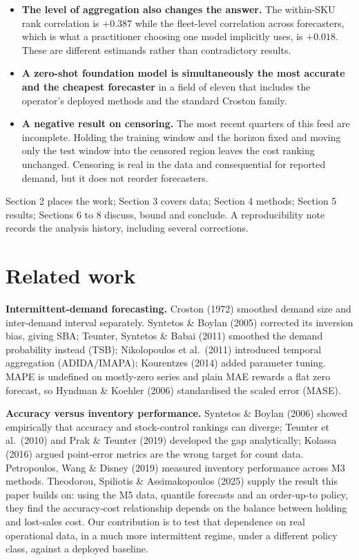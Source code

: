\documentclass[11pt]{article}
\begin{document}
\begin{itemize}
  series at $+1$, because the analytic condition holds for only 10.1 \% of M5
  series against 77.3 \% here. Conditioning on it, the mechanism does reappear
  (median $+0.614$ where the condition is met against $+0.157$ where it is
  not). So the confound is a property of how zero-dense the evaluation window
  is, not of intermittent demand as such.
\item \textbf{The level of aggregation also changes the answer.} The
  within-SKU rank correlation is $+0.387$ while the fleet-level correlation
  across forecasters, which is what a practitioner choosing one model
  implicitly uses, is $+0.018$. These are different estimands rather than
  contradictory results.
\item \textbf{A zero-shot foundation model is simultaneously the most accurate
  and the cheapest forecaster} in a field of eleven that includes the
  operator's deployed methods and the standard Croston family.
\item \textbf{A negative result on censoring.} The most recent quarters of this
  feed are incomplete. Holding the training window and the horizon fixed and
  moving only the test window into the censored region leaves the cost ranking
  unchanged. Censoring is real in the data and consequential for reported
  demand, but it does not reorder forecasters.
\end{itemize}

Section 2 places the work; Section 3 covers data; Section 4 methods; Section 5
results; Sections 6 to 8 discuss, bound and conclude. A reproducibility note
records the analysis history, including several corrections.

\section{Related work}

\textbf{Intermittent-demand forecasting.} Croston (1972) smoothed demand size
and inter-demand interval separately. Syntetos \& Boylan (2005) corrected its
inversion bias, giving SBA; Teunter, Syntetos \& Babai (2011) smoothed the
demand probability instead (TSB); Nikolopoulos et al.\ (2011) introduced
temporal aggregation (ADIDA/IMAPA); Kourentzes (2014) added parameter tuning.
MAPE is undefined on mostly-zero series and plain MAE rewards a flat zero
forecast, so Hyndman \& Koehler (2006) standardised the scaled error (MASE).

\textbf{Accuracy versus inventory performance.} Syntetos \& Boylan (2006)
showed empirically that accuracy and stock-control rankings can diverge;
Teunter et al.\ (2010) and Prak \& Teunter (2019) developed the gap
analytically; Kolassa (2016) argued point-error metrics are the wrong target
for count data. Petropoulos, Wang \& Disney (2019) measured inventory
performance across M3 methods. Theodorou, Spiliotis \& Assimakopoulos (2025)
supply the result this paper builds on: using the M5 data, quantile forecasts
and an order-up-to policy, they find the accuracy-cost relationship depends on
the balance between holding and lost-sales cost. Our contribution is to test
that dependence on real operational data, in a much more intermittent regime,
under a different policy class, against a deployed baseline.
\end{document}
